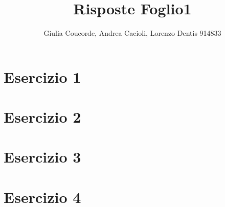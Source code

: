 \documentclass[a4paper]{article}
\begin{document}
\author{Giulia Coucorde, Andrea Cacioli, Lorenzo Dentis 914833}
\title{Risposte Foglio1}
\maketitle
\section{Esercizio 1}
\section{Esercizio 2}
\section{Esercizio 3}
\section{Esercizio 4}
\end{document}
